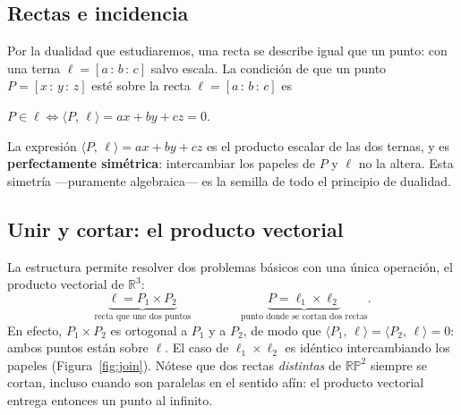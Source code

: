 \documentclass[11pt,a4paper]{article}
\newcommand{\RP}{\mathbb{RP}}
\newcommand{\R}{\mathbb{R}}
\newcommand{\inc}[2]{\langle #1,\, #2\rangle}
\newcommand{\hp}[3]{[#1\,{:}\,#2\,{:}\,#3]}
\begin{document}
\subsection{Rectas e incidencia}

Por la dualidad que estudiaremos, una recta se describe igual que un punto:
con una terna $\ell=\hp{a}{b}{c}$ salvo escala. La condición de que un
punto $P=\hp{x}{y}{z}$ esté sobre la recta $\ell=\hp{a}{b}{c}$ es

\begin{teorema}
\centering\large
$\displaystyle P\in\ell \iff \inc{P}{\ell}=ax+by+cz=0.$
\end{teorema}

\noindent La expresión $\inc{P}{\ell}=ax+by+cz$ es el producto escalar de
las dos ternas, y es \textbf{perfectamente simétrica}: intercambiar los
papeles de $P$ y $\ell$ no la altera. Esta simetría —puramente algebraica—
es la semilla de todo el principio de dualidad.

\subsection{Unir y cortar: el producto vectorial}

La estructura permite resolver dos problemas básicos con una única
operación, el producto vectorial de $\R^3$:
\[
  \underbrace{\ell = P_1\times P_2}_{\text{recta que une dos puntos}}
  \qquad\qquad
  \underbrace{P = \ell_1\times \ell_2}_{\text{punto donde se cortan dos rectas}}.
\]
En efecto, $P_1\times P_2$ es ortogonal a $P_1$ y a $P_2$, de modo que
$\inc{P_1}{\ell}=\inc{P_2}{\ell}=0$: ambos puntos están sobre $\ell$. El
caso de $\ell_1\times\ell_2$ es idéntico intercambiando los papeles
(Figura~\ref{fig:join}). Nótese que dos rectas \emph{distintas} de $\RP^2$
siempre se cortan, incluso cuando son paralelas en el sentido afín: el
producto vectorial entrega entonces un punto al infinito.
\end{document}

